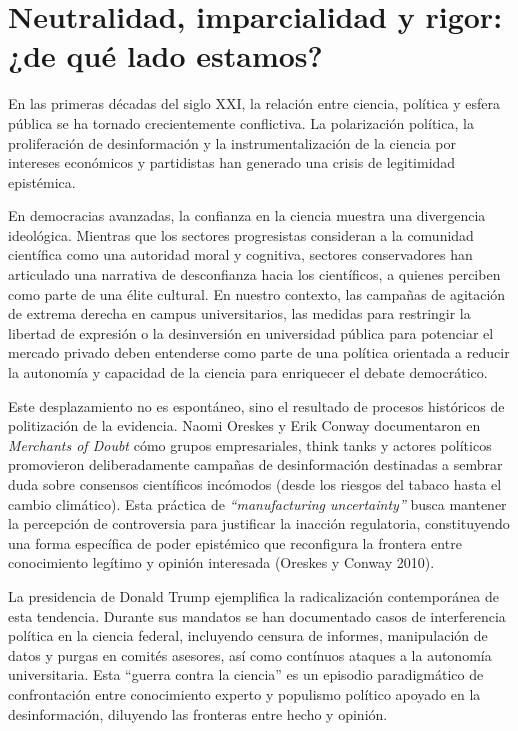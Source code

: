 \documentclass[
  spanish,
  letterpaper,
  DIV=11,
  numbers=noendperiod]{scrreprt}
\begin{document}
\section{Neutralidad, imparcialidad y rigor: ¿de qué lado
estamos?}\label{neutralidad-imparcialidad-y-rigor-de-quuxe9-lado-estamos}

En las primeras décadas del siglo XXI, la relación entre ciencia,
política y esfera pública se ha tornado crecientemente conflictiva. La
polarización política, la proliferación de desinformación y la
instrumentalización de la ciencia por intereses económicos y partidistas
han generado una crisis de legitimidad epistémica.

En democracias avanzadas, la confianza en la ciencia muestra una
divergencia ideológica. Mientras que los sectores progresistas
consideran a la comunidad científica como una autoridad moral y
cognitiva, sectores conservadores han articulado una narrativa de
desconfianza hacia los científicos, a quienes perciben como parte de una
élite cultural. En nuestro contexto, las campañas de agitación de
extrema derecha en campus universitarios, las medidas para restringir la
libertad de expresión o la desinversión en universidad pública para
potenciar el mercado privado deben entenderse como parte de una política
orientada a reducir la autonomía y capacidad de la ciencia para
enriquecer el debate democrático.

Este desplazamiento no es espontáneo, sino el resultado de procesos
históricos de politización de la evidencia. Naomi Oreskes y Erik Conway
documentaron en \emph{Merchants of Doubt} cómo grupos empresariales,
think tanks y actores políticos promovieron deliberadamente campañas de
desinformación destinadas a sembrar duda sobre consensos científicos
incómodos (desde los riesgos del tabaco hasta el cambio climático). Esta
práctica de \emph{``manufacturing uncertainty''} busca mantener la
percepción de controversia para justificar la inacción regulatoria,
constituyendo una forma específica de poder epistémico que reconfigura
la frontera entre conocimiento legítimo y opinión interesada (Oreskes y
Conway 2010).

La presidencia de Donald Trump ejemplifica la radicalización
contemporánea de esta tendencia. Durante sus mandatos se han documentado
casos de interferencia política en la ciencia federal, incluyendo
censura de informes, manipulación de datos y purgas en comités asesores,
así como contínuos ataques a la autonomía universitaria. Esta ``guerra
contra la ciencia'' es un episodio paradigmático de confrontación entre
conocimiento experto y populismo político apoyado en la desinformación,
diluyendo las fronteras entre hecho y opinión.
\end{document}
